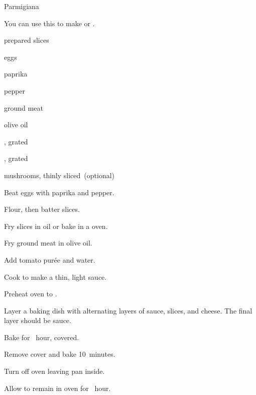 \begin{recipe}{Parmigiana}{}{}

You can use this to make  or .

\begin{ingredients}
\item prepared slices
\item eggs
\item paprika
\item pepper
\item ground meat
\item olive oil
\item {}
\item {}, grated
\item {}, grated
\item mushrooms, thinly sliced~(optional)
\end{ingredients}

\begin{directions}
\item Beat eggs with paprika and pepper.
\item Flour, then batter slices.
\item Fry slices in oil or bake in a  oven.
\item Fry ground meat in olive oil.
\item Add tomato purée and water.
\item Cook to make a thin, light sauce.
\item Preheat oven to .
\item Layer a baking dish with alternating layers of sauce, slices, and cheese. The final layer should be sauce.
\item Bake for \half~hour, covered.
\item Remove cover and bake 10~minutes.
\item Turn off oven leaving pan inside.
\item Allow to remain in oven for \half~hour.
\end{directions}
\end{recipe}
